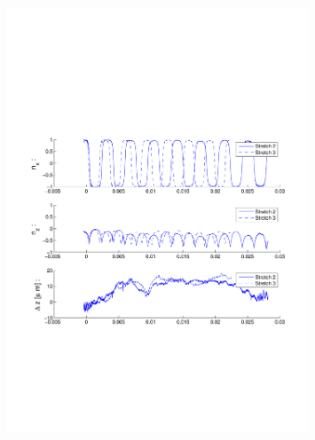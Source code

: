 \begin{figure}[H]
\centering
\includegraphics[width=0.8\textwidth]{Images/Particle 11/Stretch2.pdf}
\end{figure}


